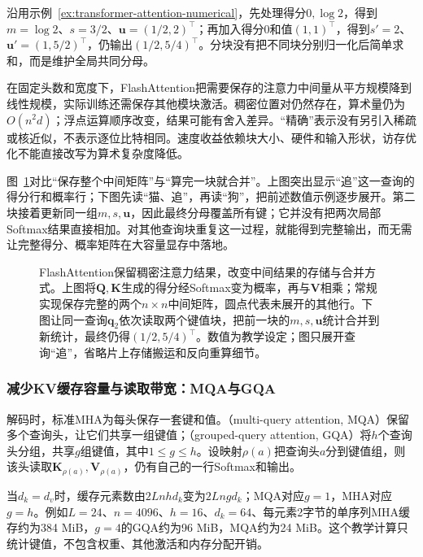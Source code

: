 沿用示例~\ref{ex:transformer-attention-numerical}，先处理得分$0,\log2$，得到$m=\log2$、$s=3/2$、$\bm u=(1/2,2)^{\top}$；再加入得分0和值$(1,1)^{\top}$，得到$s'=2$、$\bm u'=(1,5/2)^{\top}$，仍输出$(1/2,5/4)^{\top}$。分块没有把不同块分别归一化后简单求和，而是维护全局共同分母。

在固定头数和宽度下，FlashAttention把需要保存的注意力中间量从平方规模降到线性规模，实际训练还需保存其他模块激活。稠密位置对仍然存在，算术量仍为$O(n^2d)$；浮点运算顺序改变，结果可能有舍入差异。“精确”表示没有另引入稀疏或核近似，不表示逐位比特相同。速度收益依赖块大小、硬件和输入形状，访存优化不能直接改写为算术复杂度降低。

图~\ref{fig:transformer-flashattention}对比“保存整个中间矩阵”与“算完一块就合并”。上图突出显示“追”这一查询的得分行和概率行；下图先读“猫、追”，再读“狗”，把前述数值示例逐步展开。第二块接着更新同一组$m,s,\bm u$，因此最终分母覆盖所有键；它并没有把两次局部Softmax结果直接相加。对其他查询块重复这一过程，就能得到完整输出，而无需让完整得分、概率矩阵在大容量显存中落地。

\begin{figure}[htbp]
  \centering
  
  \caption{FlashAttention保留稠密注意力结果，改变中间结果的存储与合并方式。上图将$\bm Q,\bm K$生成的得分经Softmax变为概率，再与$\bm V$相乘；常规实现保存完整的两个$n\times n$中间矩阵，圆点代表未展开的其他行。下图让同一查询$\bm q_2$依次读取两个键值块，把前一块的$m,s,\bm u$统计合并到新统计，最终仍得$(1/2,5/4)^{\top}$。数值为教学设定；图只展开查询“追”，省略片上存储搬运和反向重算细节。}
  \label{fig:transformer-flashattention}
\end{figure}
\FloatBarrier

\subsubsection{减少KV缓存容量与读取带宽：MQA与GQA}

解码时，标准MHA为每头保存一套键和值。（multi-query attention, MQA）保留多个查询头，让它们共享一组键值；（grouped-query attention, GQA）将$h$个查询头分组，共享$g$组键值，其中$1\leq g\leq h$。设映射$\rho(a)$把查询头$a$分到键值组，则该头读取$\bm K_{\rho(a)},\bm V_{\rho(a)}$，仍有自己的一行Softmax和输出。

当$d_k=d_v$时，缓存元素数由$2Lnhd_k$变为$2Lngd_k$；MQA对应$g=1$，MHA对应$g=h$。例如$L=24$、$n=4096$、$h=16$、$d_k=64$、每元素2字节的单序列MHA缓存约为384 MiB，$g=4$的GQA约为96 MiB，MQA约为24 MiB。这个教学计算只统计键值，不包含权重、其他激活和内存分配开销。

